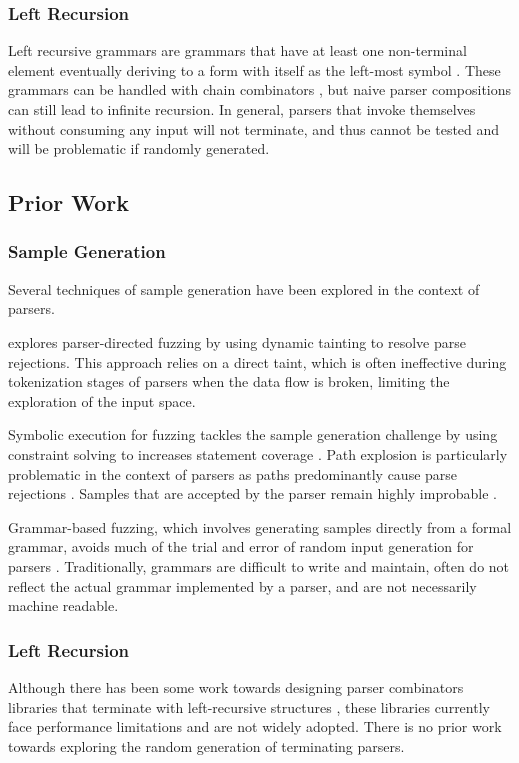 \documentclass{article}
\let\oldciteauthor\citeauthor
\renewcommand{\citeauthor}[1]{\oldciteauthor{#1} \cite{#1}}
\begin{document}
\subsubsection{Left Recursion}
Left recursive grammars are grammars that have at least one non-terminal element eventually deriving to a form with itself as the left-most symbol \cite{left-recursive}. These grammars can be handled with chain combinators \cite{design-patterns}, but naive parser compositions can still lead to infinite recursion. In general, parsers that invoke themselves without consuming any input will not terminate, and thus cannot be tested and will be problematic if randomly generated.

\subsection{Prior Work}

\subsubsection{Sample Generation}

Several techniques of sample generation have been explored in the context of parsers. 

\citeauthor{parser-directed} explores parser-directed fuzzing by using dynamic tainting to resolve parse rejections. This approach relies on a direct taint, which is often ineffective during tokenization stages of parsers when the data flow is broken, limiting the exploration of the input space.

Symbolic execution for fuzzing tackles the sample generation challenge by using constraint solving to increases statement coverage \cite{klee}. Path explosion is particularly problematic in the context of parsers as paths predominantly cause parse rejections \cite{path-explosion}. Samples that are accepted by the parser remain highly improbable \cite{parser-directed}.

Grammar-based fuzzing, which involves generating samples directly from a formal grammar, avoids much of the trial and error of random input generation for parsers \cite{grammar}. Traditionally, grammars are difficult to write and maintain, often do not reflect the actual grammar implemented by a parser, and are not necessarily machine readable.

\subsubsection{Left Recursion}
Although there has been some work towards designing parser combinators libraries that terminate with left-recursive structures \cite{left-recursive-detect}, these libraries currently face performance limitations and are not widely adopted. There is no prior work towards exploring the random generation of terminating parsers. 
\end{document}
